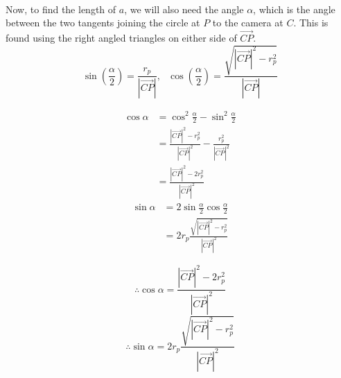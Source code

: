 \documentclass{article}
\newcommand\cpv{\overrightarrow{CP}\xspace}
\begin{document}
	\paragraph{}
	Now, to find the length of $a$, we will also need the angle $\alpha$, which is the angle between the two tangents joining the circle at $P$
	to the camera at $C$. This is found using the right angled triangles on either side of $\cpv$.
	$$\sin\left(\frac{\alpha}{2}\right)  = \frac{r_p}{\left|\cpv\right|},\text{   } \cos{\left(\frac{\alpha}{2}\right)} = \frac{\sqrt{\left|\cpv\right|^2 - r_p^2}}{\left|\cpv\right|} $$
	\pagebreak
	\begin{multicols}{2}
	\begin{align*}
		\cos{\alpha} & = \cos^2{\frac{\alpha}{2}} -  \sin^2{\frac{\alpha}{2}}\\
					& = \frac{\left|\cpv\right|^2 - r_p^2}{\left|\cpv\right|^2} - \frac{r_p^2}{\left|\cpv\right|^2}\\
					& = \frac{\left|\cpv\right|^2 - 2 r_p^2}{\left|\cpv\right|^2}
	\end{align*}
	\columnbreak
	\begin{align*}
		\sin{\alpha} & = 2 \sin{\frac{\alpha}{2}} \cos{\frac{\alpha}{2}}\\
					& = 2 r_p \frac{\sqrt{\left|\cpv\right|^2 - r_p^2}}{\left|\cpv\right|^2}
	\end{align*}
	\end{multicols}
	\begin{multicols}{2}
	\begin{equation}
		\therefore \cos{\alpha} = \frac{\left|\cpv\right|^2 - 2 r_p^2}{\left|\cpv\right|^2}
	\end{equation}
	\columnbreak
	\begin{equation}
		\therefore \sin{\alpha} = 2 r_p\frac{\sqrt{\left|\cpv\right|^2 - r_p^2}}{\left|\cpv\right|^2}
	\end{equation}
	\end{multicols}
\end{document}
